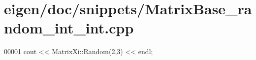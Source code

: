 \hypertarget{eigen_2doc_2snippets_2_matrix_base__random__int__int_8cpp_source}{}\section{eigen/doc/snippets/\+Matrix\+Base\+\_\+random\+\_\+int\+\_\+int.cpp}
\label{eigen_2doc_2snippets_2_matrix_base__random__int__int_8cpp_source}

\begin{DoxyCode}
00001 cout << MatrixXi::Random(2,3) << endl;
\end{DoxyCode}
